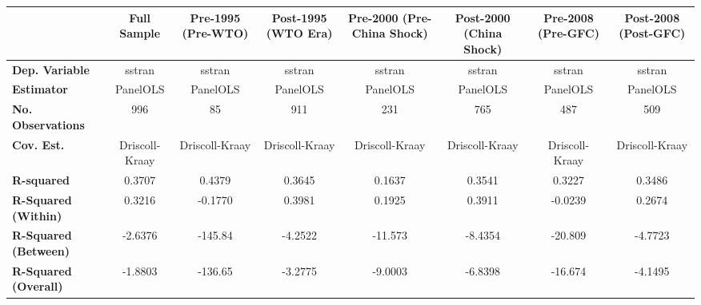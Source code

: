 \begin{center}
\begin{tabular}{lccccccc}
\toprule
                                   & \textbf{Full Sample} & \textbf{Pre-1995 (Pre-WTO)} & \textbf{Post-1995 (WTO Era)} & \textbf{Pre-2000 (Pre-China Shock)} & \textbf{Post-2000 (China Shock)} & \textbf{Pre-2008 (Pre-GFC)} & \textbf{Post-2008 (Post-GFC)}  \\
\midrule
\textbf{Dep. Variable}             &        sstran        &            sstran           &            sstran            &                sstran               &              sstran              &            sstran           &             sstran             \\
\textbf{Estimator}                 &       PanelOLS       &           PanelOLS          &           PanelOLS           &               PanelOLS              &             PanelOLS             &           PanelOLS          &            PanelOLS            \\
\textbf{No. Observations}          &         996          &              85             &             911              &                 231                 &               765                &             487             &              509               \\
\textbf{Cov. Est.}                 &    Driscoll-Kraay    &        Driscoll-Kraay       &        Driscoll-Kraay        &            Driscoll-Kraay           &          Driscoll-Kraay          &        Driscoll-Kraay       &         Driscoll-Kraay         \\
\textbf{R-squared}                 &        0.3707        &            0.4379           &            0.3645            &                0.1637               &              0.3541              &            0.3227           &             0.3486             \\
\textbf{R-Squared (Within)}        &        0.3216        &           -0.1770           &            0.3981            &                0.1925               &              0.3911              &           -0.0239           &             0.2674             \\
\textbf{R-Squared (Between)}       &       -2.6376        &           -145.84           &           -4.2522            &               -11.573               &             -8.4354              &           -20.809           &            -4.7723             \\
\textbf{R-Squared (Overall)}       &       -1.8803        &           -136.65           &           -3.2775            &               -9.0003               &             -6.8398              &           -16.674           &            -4.1495             \\

\end{tabular}
\end{center}
